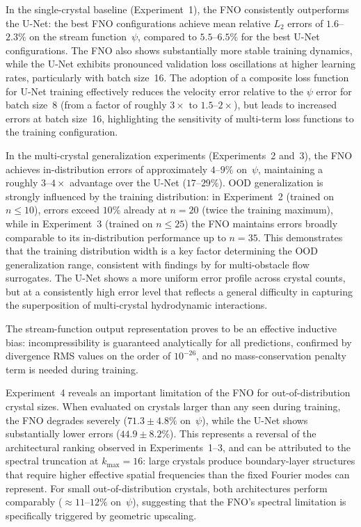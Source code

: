 In the single-crystal baseline (Experiment~1), the FNO consistently outperforms the U-Net: the best FNO configurations achieve mean relative $L_2$ errors of $1.6$--$2.3\%$ on the stream function~$\psi$, compared to $5.5$--$6.5\%$ for the best U-Net configurations. The FNO also shows substantially more stable training dynamics, while the U-Net exhibits pronounced validation loss oscillations at higher learning rates, particularly with batch size~16. The adoption of a composite loss function for U-Net training effectively reduces the velocity error relative to the $\psi$ error for batch size~8 (from a factor of roughly $3\times$ to $1.5$--$2\times$), but leads to increased errors at batch size~16, highlighting the sensitivity of multi-term loss functions to the training configuration.

In the multi-crystal generalization experiments (Experiments~2 and~3), the FNO achieves in-distribution errors of approximately $4$--$9\%$ on~$\psi$, maintaining a roughly $3$--$4\times$ advantage over the U-Net ($17$--$29\%$). OOD generalization is strongly influenced by the training distribution: in Experiment~2 (trained on $n \leq 10$), errors exceed $10\%$ already at $n = 20$ (twice the training maximum), while in Experiment~3 (trained on $n \leq 25$) the FNO maintains errors broadly comparable to its in-distribution performance up to $n = 35$. This demonstrates that the training distribution width is a key factor determining the OOD generalization range, consistent with findings by \textcite{morimoto_generalization_2022} for multi-obstacle flow surrogates. The U-Net shows a more uniform error profile across crystal counts, but at a consistently high error level that reflects a general difficulty in capturing the superposition of multi-crystal hydrodynamic interactions.

The stream-function output representation proves to be an effective inductive bias: incompressibility is guaranteed analytically for all predictions, confirmed by divergence RMS values on the order of $10^{-26}$, and no mass-conservation penalty term is needed during training.

Experiment~4 reveals an important limitation of the FNO for out-of-distribution crystal sizes. When evaluated on crystals larger than any seen during training, the FNO degrades severely ($71.3 \pm 4.8\%$ on~$\psi$), while the U-Net shows substantially lower errors ($44.9 \pm 8.2\%$). This represents a reversal of the architectural ranking observed in Experiments~1--3, and can be attributed to the spectral truncation at $k_{\max} = 16$: large crystals produce boundary-layer structures that require higher effective spatial frequencies than the fixed Fourier modes can represent. For small out-of-distribution crystals, both architectures perform comparably ($\approx 11$--$12\%$ on~$\psi$), suggesting that the FNO's spectral limitation is specifically triggered by geometric upscaling.

